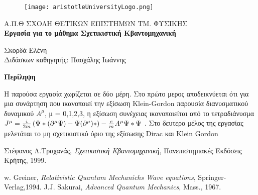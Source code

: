 \documentclass[12pt,oneside,titlepage,a4paper]{article}
\newcommand{\rbr}{
  \ensuremath{\right) }
}
\newcommand{\lbr}{
  \ensuremath{\left( }
}
\renewenvironment{abstract}[1][1.0]
{
	\begin{center}
		{\bf Περίληψη}\\[12pt]
		\begin{minipage}{#1\textwidth}
}
{
		\end{minipage}
	\end{center}
}
\begin{document}

\begin{titlepage}
	\begin{figure}[H]
		\centering
		\texttt{[image: aristotleUniversityLogo.png]}
	\end{figure}
	
	\begin{center}
		\large{{\sc Α.Π.Θ} ΣΧΟΛΗ ΘΕΤΙΚΩΝ ΕΠΙΣΤΗΜΩΝ ΤΜ. ΦΥΣΙΚΗΣ}\\[0.5cm]
		\LARGE\textbf{Εργασία για το μάθημα Σχετικιστική Κβαντομηχανική}\\[1.0cm] 

		\vspace{0.0cm}

		\small{Σκορδά Ελένη}\\[0.2cm]
               
		\small{Διδάσκων καθηγητής: Πασχάλης Ιωάννης }\\[0.2cm]

	\end{center}

	\begin{abstract}
	  Η παρούσα εργασία χωρίζεται σε δύο μέρη. Στο πρώτο μερος αποδεικνύεται ότι για μια συνάρτηση που ικανοποιεί την εξίσωση \textlatin{Klein-Gordon} παρουσία διανυσματικού δυναμικού $A^\mu$, μ = 0,1,2,3, η εξίσωση συνέχειας ικανοποιείται από το τετραδιάνυσμα $J^\mu =\frac{i}{2m} \lbr \Psi* (\partial^\mu \Psi)-\Psi(\partial^\mu)* \rbr - \frac{e}{m}A^\mu \Psi* \Psi$ . Στο δευτερο μέλος της εργασίας μελετάται το μη σχετικιστικό όριο της εξίσωσης \textlatin{Dirac} και \textlatin{Klein Gordon}  
          
	\end{abstract}
        
	\vfill

\end{titlepage}

\newpage


\tableofcontents
\newpage



\pagebreak

\pagebreak




\begin{thebibliography}{9}

  Στέφανος Λ.Τραχανάς,
  \emph{Σχετικιστική Κβαντομηχανική},
  Πανεπιστημιακές Εκδόσεις Κρήτης, 1999.

   w. Greiner,
  \emph{Relativistic Quantum Mechanichs Wave equations},
  Springer-Verlag,1994.
   J.J. Sakurai,
  \emph{Advanced Quantum Mechanics},
  Mass., 1967.
\end{thebibliography}
\end{document}
